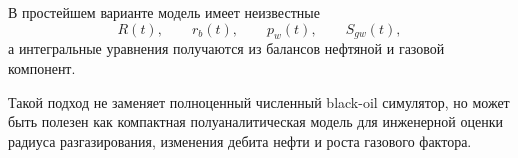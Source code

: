 \documentclass[12pt,a4paper]{article}
\begin{document}
В простейшем варианте модель имеет неизвестные
\begin{equation}
    R(t), \qquad r_b(t), \qquad p_w(t), \qquad S_{gw}(t),
\end{equation}
а интегральные уравнения получаются из балансов нефтяной и газовой компонент.

Такой подход не заменяет полноценный численный black-oil симулятор, но может быть полезен как компактная полуаналитическая модель для инженерной оценки радиуса разгазирования, изменения дебита нефти и роста газового фактора.
\end{document}
